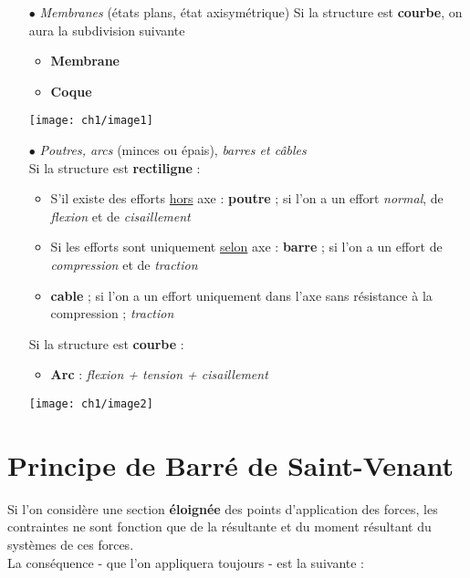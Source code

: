 \begin{itemize}
\item[$\bullet$] \textit{Membranes} (états plans, état axisymétrique)
Si la structure est \textbf{courbe}, on aura la subdivision suivante 
	\begin{itemize}
	\item \textbf{Membrane}
	\item \textbf{Coque}
	\end{itemize}
\begin{center}
\texttt{[image: ch1/image1]}
\end{center}
\newpage
\item[$\bullet$] \textit{Poutres, arcs} (minces ou épais), \textit{
barres et câbles}\\
Si la structure est \textbf{rectiligne} :
	\begin{itemize}
	\item S'il existe des efforts \underline{hors} axe :
	\textbf{poutre} ;  si l'on a un effort \textit{normal}, de 
	\textit{flexion} et de \textit{cisaillement}
	\item Si les efforts sont uniquement \underline{selon} axe : 
	\textbf{barre}	;  si l'on a un effort de \textit{compression} 
	et de \textit{traction}
	\item \textbf{cable}	;  si l'on a un effort uniquement dans l'axe 
	sans résistance à la compression ; \textit{traction}
	\end{itemize}
Si la structure est \textbf{courbe} :
	\begin{itemize}
	\item \textbf{Arc } : \textit{flexion + tension + cisaillement}
	\end{itemize}	
	
\begin{center}
\texttt{[image: ch1/image2]}
\end{center}
\end{itemize}



\section{Principe de Barré de Saint-Venant}
Si l'on considère une section \textbf{éloignée} des points d'application 
des forces, les contraintes ne sont fonction que de la résultante et du 
moment résultant du systèmes de ces forces.\\
La conséquence - que l'on appliquera toujours - est la suivante :\\

